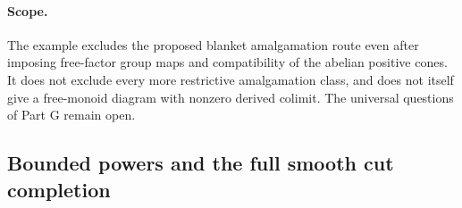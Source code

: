 \paragraph{Scope.}
The example excludes the proposed blanket amalgamation
route even after imposing free-factor group maps and
compatibility of the abelian positive cones. It does not
exclude every more restrictive amalgamation class, and does
not itself give a free-monoid diagram with nonzero derived
colimit. The universal questions of Part G remain open.



\subsection{Bounded powers and the full smooth cut completion}

